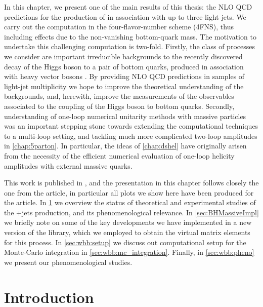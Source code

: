In this chapter, we present one of the main results of this thesis:
the NLO QCD predictions for the production of \Wbb{} in association with up to three light jets.
We carry out the computation in the four-flavor-number scheme (4FNS), thus including effects due to the non-vanishing bottom-quark mass.
The motivation to undertake this challenging computation is two-fold.
Firstly, the class of processes we consider are important irreducible backgrounds to the recently discovered decay of the Higgs boson 
to a pair of bottom quarks, produced in association with heavy vector bosons \cite{Sirunyan:2018kst,Aaboud:2018zhk}.
By providing NLO QCD predictions in samples of light-jet multiplicity we hope to improve the theoretical 
understanding of the backgrounds, and, herewith, improve the measurements of the observables associated to 
the coupling of the Higgs boson to bottom quarks.
Secondly, understanding of one-loop numerical unitarity methods with massive particles
was an important stepping stone towards extending the computational techniques to a multi-loop setting,
and tackling much more complicated two-loop amplitudes in \cref{chap:5parton}.
In particular, the ideas of \cref{chap:dshel} have originally arisen from the necessity of the efficient
numerical evaluation of one-loop helicity amplitudes with external massive quarks.

This work is published in \cite{Anger:2017glm}, 
and the presentation in this chapter follows closely the one from the article,
in particular all plots we show here have been produced for the article.
In \cref{sec:wbb:relevance} we overview the status of theoretical and experimental studies of
the \Wbb{}+jets production, and its phenomenological relevance.
In \cref{sec:BHMassiveImpl} we briefly note on some of the
key developments we have implemented in a new version of the \BlackHat{} library,
which we employed to obtain the virtual matrix elements for this process.
In \cref{sec:wbb:setup} we discuss out computational setup for the Monte-Carlo integration
in \cref{sec:wbb:mc_integration}. Finally, in \cref{sec:wbb:pheno} we present our phenomenological studies.

\section{Introduction}
\label{sec:wbb:relevance}

